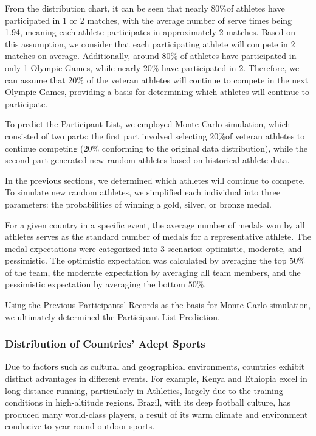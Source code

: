 \documentclass[12pt]{article}  %
\begin{document}
From the distribution chart, it can be seen that nearly \( 80\% \)of athletes have participated in 1 or 2 matches, with the average number of serve times being 1.94, meaning each athlete participates in approximately 2 matches. Based on this assumption, we consider that each participating athlete will compete in 2 matches on average. Additionally, around \( 80\% \) of athletes have participated in only 1 Olympic Games, while nearly \( 20\% \) have participated in 2. Therefore, we can assume that \( 20\% \) of the veteran athletes will continue to compete in the next Olympic Games, providing a basis for determining which athletes will continue to participate.

To predict the Participant List, we employed Monte Carlo simulation, which consisted of two parts: the first part involved selecting \( 20\% \)of veteran athletes to continue competing (\( 20\% \) conforming to the original data distribution), while the second part generated new random athletes based on historical athlete data.

In the previous sections, we determined which athletes will continue to compete. To simulate new random athletes, we simplified each individual into three parameters: the probabilities of winning a gold, silver, or bronze medal.

For a given country in a specific event, the average number of medals won by all athletes serves as the standard number of medals for a representative athlete. The medal expectations were categorized into 3 scenarios: optimistic, moderate, and pessimistic. The optimistic expectation was calculated by averaging the top \( 50\% \) of the team, the moderate expectation by averaging all team members, and the pessimistic expectation by averaging the bottom \( 50\% \).

Using the Previous Participants' Records as the basis for Monte Carlo simulation, we ultimately determined the Participant List Prediction.



\subsubsection{Distribution of Countries' Adept Sports}
Due to factors such as cultural and geographical environments, countries exhibit distinct advantages in different events. For example, Kenya and Ethiopia excel in long-distance running, particularly in Athletics, largely due to the training conditions in high-altitude regions. Brazil, with its deep football culture, has produced many world-class players, a result of its warm climate and environment conducive to year-round outdoor sports.
\end{document}
